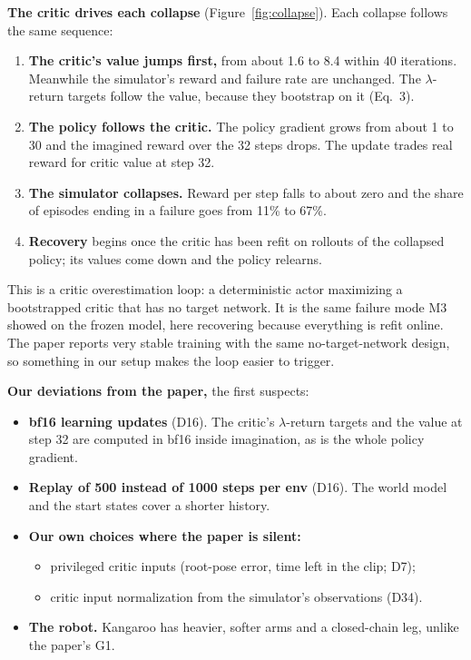 \documentclass[10pt]{article}
\newcommand{\fig}[1]{Figure~\ref{#1}}
\begin{document}
\textbf{The critic drives each collapse} (\fig{fig:collapse}). Each collapse follows the same
sequence:
\begin{enumerate}
  \item \textbf{The critic's value jumps first,} from about 1.6 to 8.4 within 40 iterations. Meanwhile
  the simulator's reward and failure rate are unchanged. The $\lambda$-return targets follow the
  value, because they bootstrap on it (Eq.~3).
  \item \textbf{The policy follows the critic.} The policy gradient grows from about 1 to 30 and the
  imagined reward over the 32 steps drops. The update trades real reward for critic value at step 32.
  \item \textbf{The simulator collapses.} Reward per step falls to about zero and the share of episodes
  ending in a failure goes from 11\% to 67\%.
  \item \textbf{Recovery} begins once the critic has been refit on rollouts of the collapsed policy;
  its values come down and the policy relearns.
\end{enumerate}
This is a critic overestimation loop: a deterministic actor maximizing a bootstrapped critic that has
no target network. It is the same failure mode M3 showed on the frozen model, here recovering because
everything is refit online. The paper reports very stable training with the same no-target-network
design, so something in our setup makes the loop easier to trigger.

\textbf{Our deviations from the paper,} the first suspects:
\begin{itemize}
  \item \textbf{bf16 learning updates} (D16). The critic's $\lambda$-return targets and the value at
  step 32 are computed in bf16 inside imagination, as is the whole policy gradient.
  \item \textbf{Replay of 500 instead of 1000 steps per env} (D16). The world model and the start
  states cover a shorter history.
  \item \textbf{Our own choices where the paper is silent:}
  \begin{itemize}
    \item privileged critic inputs (root-pose error, time left in the clip; D7);
    \item critic input normalization from the simulator's observations (D34).
  \end{itemize}
  \item \textbf{The robot.} Kangaroo has heavier, softer arms and a closed-chain leg, unlike the
  paper's G1.
\end{itemize}
\end{document}
